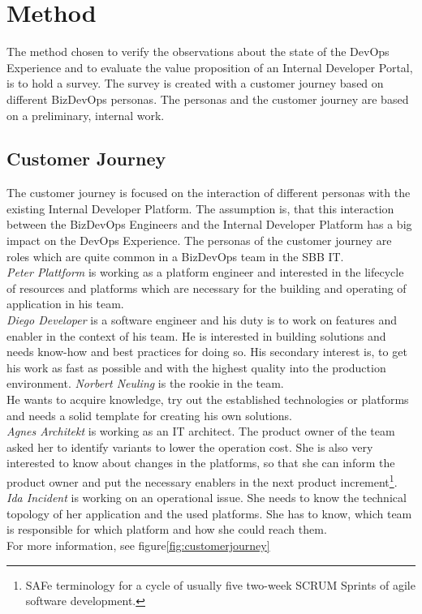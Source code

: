 \documentclass[a4paper,12pt]{article}
\begin{document}
    \section{Method}
    \label{sec:method}
    The method chosen to verify the observations about the state of the DevOps Experience and to evaluate the value proposition
    of an Internal Developer Portal, is to hold a survey.
    The survey is created with a customer journey based on different BizDevOps personas.
    The personas and the customer journey are based on a preliminary, internal work\parencite{sbbjobstobedone}.

    \subsection{Customer Journey}
    \label{subsec:cusjour}
    The customer journey is focused on the interaction of different personas with the existing Internal Developer Platform.
    The assumption is, that this interaction between the BizDevOps Engineers and the Internal Developer Platform has a big
    impact on the DevOps Experience.
    The personas of the customer journey are roles which are quite common in a BizDevOps team in the SBB IT.\\
    \textit{Peter Plattform} is working as a platform engineer and interested in the lifecycle of resources and platforms which
    are necessary for the building and operating of application in his team.\\
    \textit{Diego Developer} is a software engineer and his duty is to work on features and enabler in the context of his team.
    He is interested in building solutions and needs know-how and best practices for doing so.
    His secondary interest is, to get his work as fast as possible and with the highest quality into the production environment.
    \textit{Norbert Neuling} is the rookie in the team.\\
    He wants to acquire knowledge, try out the established technologies or platforms and needs a solid template for creating
    his own solutions.\\
    \textit{Agnes Architekt} is working as an IT architect.
    The product owner of the team asked her to identify variants to lower the operation cost.
    She is also very interested
    to know about changes in the platforms, so that she can inform the product owner and put the necessary enablers in
    the next product increment\footnote{SAFe terminology for a cycle of usually five two-week SCRUM Sprints of agile software development.}.\\
    \textit{Ida Incident} is working on an operational issue.
    She needs to know the technical topology of her application and the used platforms.
    She has to know, which team is responsible for which platform and how she could reach them.\\
    For more information, see figure\ref{fig:customerjourney}
\end{document}
